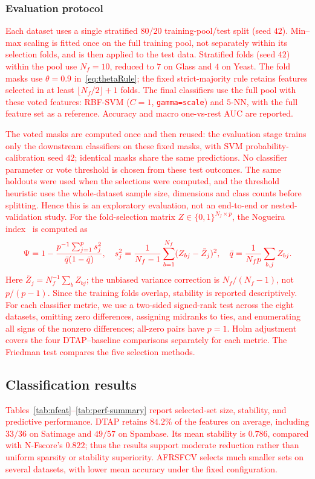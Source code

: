\documentclass[]{interact}
\theoremstyle{plain}
\theoremstyle{definition}
\theoremstyle{remark}
\begin{document}
\subsubsection{Evaluation protocol}\label{sssec:protocol}
\leavevmode\textcolor{red}{Each dataset uses a single stratified $80/20$ training-pool/test split
(seed $42$). Min--max scaling is fitted once on the full training pool, not
separately within its selection folds, and is then applied to the test data.
Stratified folds (seed $42$) within the pool use $N_f=10$, reduced to $7$ on Glass
and $4$ on Yeast. The fold masks use $\theta=0.9$ in~\eqref{eq:thetaRule};
the fixed strict-majority rule retains features selected in at least
$\lfloor N_f/2\rfloor+1$ folds. The final classifiers use the full pool with these
voted features: RBF-SVM ($C=1$, \texttt{gamma=scale}) and $5$-NN, with the full
feature set as a reference. Accuracy and macro one-vs-rest AUC are reported.}

\leavevmode\textcolor{red}{The voted masks are computed once and then reused: the evaluation stage trains
only the downstream classifiers on these fixed masks, with SVM probability-calibration
seed $42$; identical masks share the same predictions. No classifier parameter or vote threshold
is chosen from these test outcomes. The same holdouts were used when the selections
were computed, and the threshold heuristic uses the whole-dataset sample size, dimensions
and class counts before splitting. Hence this is an exploratory evaluation,
not an end-to-end or nested-validation study.
For the fold-selection matrix $Z\in\{0,1\}^{N_f\times p}$, the Nogueira index~\citep{nogueira2018}
is computed as}
\[\textcolor{red}{
\Psi=1-\frac{p^{-1}\sum_{j=1}^{p}s_j^2}{\bar q(1-\bar q)},\quad
s_j^2=\frac{1}{N_f-1}\sum_{b=1}^{N_f}(Z_{bj}-\bar Z_j)^2,\quad
\bar q=\frac{1}{N_f p}\sum_{b,j}Z_{bj}.
}\]
\leavevmode\textcolor{red}{Here $\bar Z_j=N_f^{-1}\sum_b Z_{bj}$; the unbiased variance correction is
$N_f/(N_f-1)$, not $p/(p-1)$.
Since the training folds overlap, stability is reported descriptively.
For each classifier metric, we use a two-sided signed-rank test across the
eight datasets, omitting zero differences, assigning midranks to ties, and
enumerating all signs of the nonzero differences; all-zero pairs have $p=1$.
Holm adjustment covers the four DTAP--baseline comparisons separately for
each metric. The Friedman test compares the five selection methods.}

\subsection{Classification results}\label{ssec:results}
\leavevmode\textcolor{red}{Tables~\ref{tab:nfeat}--\ref{tab:perf-summary} report selected-set size,
stability, and predictive performance. DTAP retains $84.2\%$ of the features
on average, including $33/36$ on Satimage and $49/57$ on Spambase.
Its mean stability is $0.786$, compared with N-Fscore's $0.822$;
thus the results support moderate reduction rather than uniform sparsity
or stability superiority. AFRSFCV selects much smaller sets on several datasets,
with lower mean accuracy under the fixed configuration.}
\end{document}

